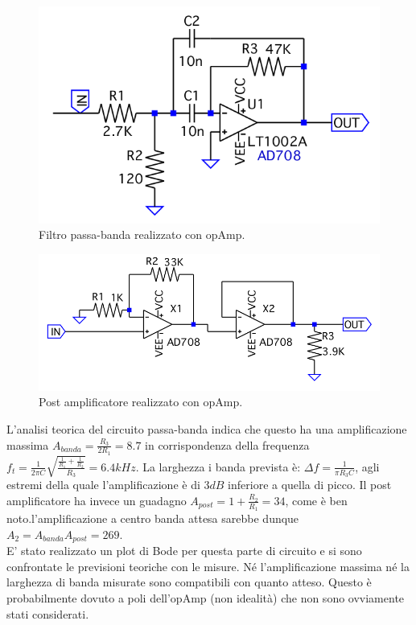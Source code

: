 \documentclass[10pt,a4paper]{article}
\begin{document}
\begin{figure}[!htb]
\centering
\includegraphics[scale=0.5]{banda.png}
\caption{Filtro passa-banda realizzato con opAmp.\label{banda}}
\end{figure}


\begin{figure}[!htb]
\centering
\includegraphics[scale=0.5]{postamp.png}
\caption{Post amplificatore realizzato con opAmp.\label{postamp}}
\end{figure}

L'analisi teorica del circuito passa-banda indica che questo ha una amplificazione massima $A_{banda} = \frac{R_3}{2 R_1} = 8.7$ in corrispondenza della frequenza $f_t = \frac{1}{2 \pi C} \sqrt{\frac{\frac{1}{R_1} + \frac{1}{R_2}}{R_3}} = 6.4 kHz$. La larghezza i banda prevista è: $\Delta f = \frac{1}{\pi R_3 C}$, agli estremi della quale l'amplificazione è di $3 dB$ inferiore a quella di picco. Il post amplificatore ha invece un guadagno $A_{post} = 1 + \frac{R_2}{R_1} = 34$, come è ben noto.l'amplificazione a centro banda attesa sarebbe dunque $A_{2} = A_{banda} A_{post} = 269$.\\

E' stato realizzato un plot di Bode per questa parte di circuito e si sono confrontate le previsioni teoriche con le misure. Né l'amplificazione massima né la larghezza di banda misurate sono compatibili con quanto atteso. Questo è probabilmente dovuto a poli dell'opAmp (non idealità) che non sono ovviamente stati considerati.\\
\end{document}
